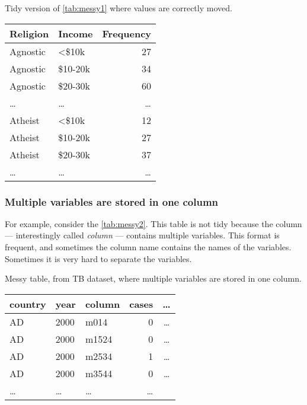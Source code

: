 \begin{tablebox}[label=tab:tidy1]{Tidy version of \cref{tab:messy1} where values are correctly moved.}
  \centering
  \begin{tabular}{l l r}
    \toprule
    \textbf{Religion} & \textbf{Income} & \textbf{Frequency} \\
    \midrule
    Agnostic & <\$10k & 27 \\
    Agnostic & \$10-20k & 34 \\
    Agnostic & \$20-30k & 60 \\
    \dots & \dots & \dots \\
    Atheist & <\$10k & 12 \\
    Atheist & \$10-20k & 27 \\
    Atheist & \$20-30k & 37 \\
    \dots & \dots & \dots \\
    \bottomrule
  \end{tabular}
\end{tablebox}

\clearpage
\subsubsection{Multiple variables are stored in one column}  For example, consider the
\cref{tab:messy2}.  This table is not tidy because the column --- interestingly called
\emph{column} --- contains multiple variables.  This format is frequent, and sometimes the
column name contains the names of the variables.  Sometimes it is very hard to separate
the variables.

\begin{tablebox}[label=tab:messy2]{Messy table, from TB dataset, where multiple variables are stored in one column.}
  \centering
  \begin{tabular}{l l l r c}
    \toprule
    \textbf{country} & \textbf{year} & \textbf{column} & \textbf{cases} & \textbf{\dots} \\
    \midrule
    AD & 2000 & m014 & 0 & \dots \\
    AD & 2000 & m1524 & 0 & \dots \\
    AD & 2000 & m2534 & 1 & \dots \\
    AD & 2000 & m3544 & 0 & \dots \\
    \dots & \dots & \dots & \dots \\
    \bottomrule
  \end{tabular}
\end{tablebox}

